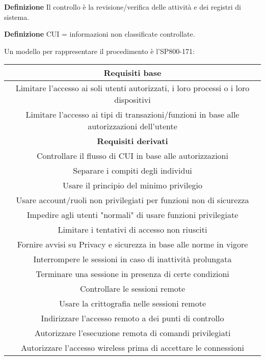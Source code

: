 \documentclass{article}
\newcommand{\df}[1]{\noindent\textbf{Definizione } #1.\newline}
\begin{document}
\df{Il controllo è la revisione/verifica delle attività e dei registri di sistema}

\df{CUI = informazioni non classificate controllate}

\noindent Un modello per rappresentare il procedimento è l'SP800-171:

\begin{table}[ht]
    \centering
    \begin{tabular}{|c|}
        \hline
        \textbf{Requisiti base}\\
        \hline
        Limitare l'accesso ai soli utenti autorizzati, i loro processi o i loro dispositivi\\
        \hline
        Limitare l'accesso ai tipi di transazioni/funzioni in base alle autorizzazioni dell'utente\\
        \hline
        \textbf{Requisiti derivati}\\
        \hline
        Controllare il flusso di CUI in base alle autorizzazioni\\
        \hline
        Separare i compiti degli individui\\
        \hline
        Usare il principio del minimo privilegio\\
        \hline
        Usare account/ruoli non privilegiati per funzioni non di sicurezza\\
        \hline
        Impedire agli utenti "normali" di usare funzioni privilegiate\\
        \hline
        Limitare i tentativi di accesso non riusciti\\
        \hline
        Fornire avvisi su Privacy e sicurezza in base alle norme in vigore\\
        \hline
        Interrompere le sessioni in caso di inattività prolungata\\
        \hline
        Terminare una sessione in presenza di certe condizioni\\
        \hline
        Controllare le sessioni remote\\
        \hline
        Usare la crittografia nelle sessioni remote\\
        \hline
        Indirizzare l'accesso remoto a dei punti di controllo\\
        \hline
        Autorizzare l'esecuzione remota di comandi privilegiati\\
        \hline
        Autorizzare l'accesso wireless prima di accettare le connessioni\\

\end{tabular}
\end{table}
\end{document}
